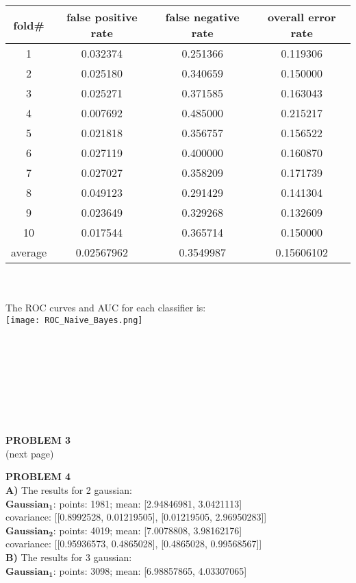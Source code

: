 \documentclass[11pt,a4paper,fleqn]{article}
\begin{document}
\begin{tabular}{|c|c|c|c|}
\hline
fold\#&false positive rate&false negative rate&overall error rate\\
\hline
1&0.032374&0.251366&0.119306\\
\hline
2&0.025180&0.340659&0.150000\\
\hline
3&0.025271&0.371585&0.163043\\
\hline
4&0.007692&0.485000&0.215217\\
\hline
5&0.021818&0.356757&0.156522\\
\hline
6&0.027119&0.400000&0.160870\\
\hline
7&0.027027&0.358209&0.171739\\
\hline
8&0.049123&0.291429&0.141304\\
\hline
9&0.023649&0.329268&0.132609\\
\hline
10&0.017544&0.365714&0.150000\\
\hline
average&0.02567962&0.3549987&0.15606102\\
\hline
\end{tabular}\\
\\
The ROC curves and AUC for each classifier is:\\
\texttt{[image: ROC\_Naive\_Bayes.png]}\\
\\ \\ \\ \\ \\ \\ \\ \\
\textbf{PROBLEM 3}\\
(next page)

\newpage \noindent 
\textbf{PROBLEM 4}\\
\textbf{A)} The results for 2 gaussian:\\
\indent $\mathbf{Gaussian_1}$: points: 1981; mean: [2.94846981, 3.0421113]\\
\indent covariance: [[0.8992528, 0.01219505], [0.01219505, 2.96950283]] \\
\indent $\mathbf{Gaussian_2}$: points: 4019; mean: [7.0078808, 3.98162176]\\
\indent covariance: [[0.95936573, 0.4865028], [0.4865028, 0.99568567]] \\
\textbf{B)} The results for 3 gaussian:\\
\indent $\mathbf{Gaussian_1}$: points: 3098; mean: [6.98857865, 4.03307065]\\
\end{document}
